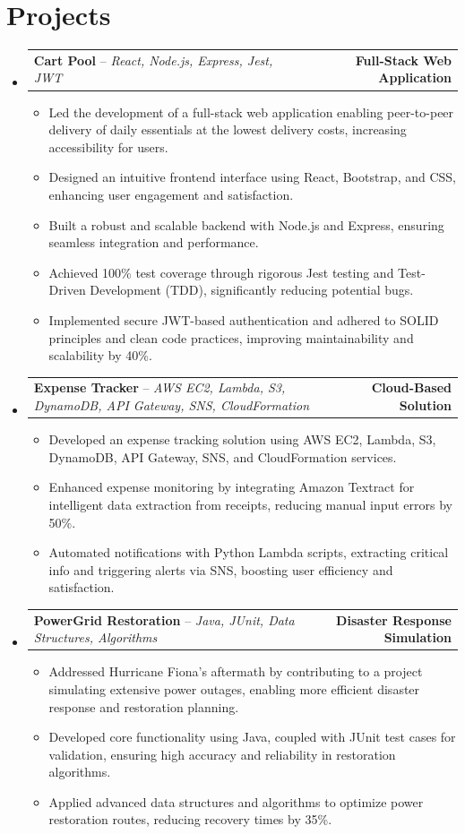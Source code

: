 \documentclass[letterpaper,11pt]{article}
\makeatletter
\newcommand{\resumeItem}[1]{
  \item\small{
    {#1 \vspace{-2pt}}
  }
}
\newcommand{\resumeProjectHeading}[2]{
    \item
    \begin{tabular*}{1.001\textwidth}{l@{\extracolsep{\fill}}r}
      \small#1 & \textbf{\small #2}\\
    \end{tabular*}\vspace{-7pt}
}
\newcommand{\resumeSubHeadingListStart}{\begin{itemize}[leftmargin=0.0in, label={}]}
\newcommand{\resumeSubHeadingListEnd}{\end{itemize}}
\newcommand{\resumeItemListStart}{\begin{itemize}}
\newcommand{\resumeItemListEnd}{\end{itemize}\vspace{-5pt}}
\makeatother
\begin{document}
\section{Projects}
    \vspace{-5pt}
    \resumeSubHeadingListStart
    
      \resumeProjectHeading
          {\textbf{Cart Pool} -- \emph{React, Node.js, Express, Jest, JWT}}{Full-Stack Web Application}
          \resumeItemListStart
            \resumeItem{Led the development of a full-stack web application enabling peer-to-peer delivery of daily essentials at the lowest delivery costs, increasing accessibility for users.}
            \resumeItem{Designed an intuitive frontend interface using React, Bootstrap, and CSS, enhancing user engagement and satisfaction.}
            \resumeItem{Built a robust and scalable backend with Node.js and Express, ensuring seamless integration and performance.}
            \resumeItem{Achieved 100\% test coverage through rigorous Jest testing and Test-Driven Development (TDD), significantly reducing potential bugs.}
            \resumeItem{Implemented secure JWT-based authentication and adhered to SOLID principles and clean code practices, improving maintainability and scalability by 40\%.}
          \resumeItemListEnd
          \vspace{-13pt}
          
      \resumeProjectHeading
          {\textbf{Expense Tracker} -- \emph{AWS EC2, Lambda, S3, DynamoDB, API Gateway, SNS, CloudFormation}}{Cloud-Based Solution}
          \resumeItemListStart
            \resumeItem{Developed an expense tracking solution using AWS EC2, Lambda, S3, DynamoDB, API Gateway, SNS, and CloudFormation services.}
            \resumeItem{Enhanced expense monitoring by integrating Amazon Textract for intelligent data extraction from receipts, reducing manual input errors by 50\%.}
            \resumeItem{Automated notifications with Python Lambda scripts, extracting critical info and triggering alerts via SNS, boosting user efficiency and satisfaction.}
          \resumeItemListEnd
          \vspace{-13pt}
          
      \resumeProjectHeading
          {\textbf{PowerGrid Restoration} -- \emph{Java, JUnit, Data Structures, Algorithms}}{Disaster Response Simulation}
          \resumeItemListStart
            \resumeItem{Addressed Hurricane Fiona's aftermath by contributing to a project simulating extensive power outages, enabling more efficient disaster response and restoration planning.}
            \resumeItem{Developed core functionality using Java, coupled with JUnit test cases for validation, ensuring high accuracy and reliability in restoration algorithms.}
            \resumeItem{Applied advanced data structures and algorithms to optimize power restoration routes, reducing recovery times by 35\%.}
          \resumeItemListEnd
          
    \resumeSubHeadingListEnd
\vspace{-15pt}
\end{document}
